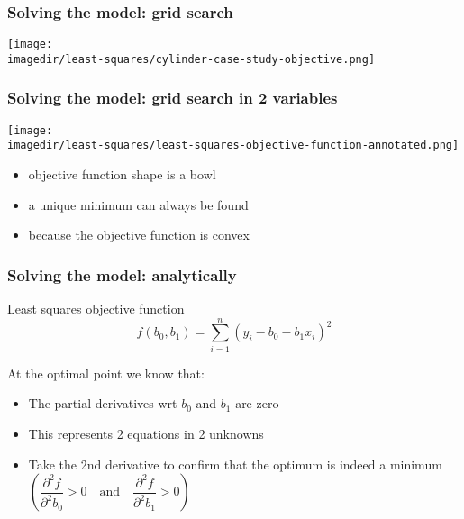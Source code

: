 \begin{frame}\frametitle{Solving the model: grid search}
	\begin{center}
		\texttt{[image: \\imagedir/least-squares/cylinder-case-study-objective.png]}
	\end{center}
\end{frame}

\begin{frame}\frametitle{Solving the model: grid search in 2 variables}
	\begin{center}
		\texttt{[image: \\imagedir/least-squares/least-squares-objective-function-annotated.png]}
	\end{center}
	\begin{itemize}
		\item	objective function shape is a bowl
		\item	a unique minimum can always be found
		\item	because the objective function is convex
	\end{itemize}
\end{frame}

\begin{frame}\frametitle{Solving the model: analytically}
	\begin{block}{Least squares objective function}
		$$ f(b_0, b_1) = \sum_{i=1}^{n}{\left(y_i - b_0 - b_1 x_i\right)^2} $$
	\end{block}

	At the optimal point we know that:
	\begin{itemize}
		\item	The partial derivatives wrt $b_0$ and $b_1$ are zero
		\item	This represents 2 equations in 2 unknowns
		\item	Take the 2nd derivative to confirm that the optimum is indeed a minimum $\left(\dfrac{
		\partial^2 f}{
		\partial^2 b_0} > 0 \quad \text{and} \quad \dfrac{
		\partial^2 f}{
		\partial^2 b_1} > 0\right)$
	\end{itemize}
\end{frame}

